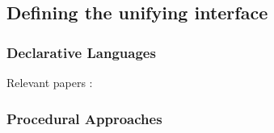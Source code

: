

\subsection{Defining the unifying interface}

\subsubsection{Declarative Languages}

Relevant papers : ~\cite{Lenzerini2002} ~\cite{Kirk1995} ~\cite{Katsis2009}
~\cite{Srivastava2006} ~\cite{Tatbul2010} ~\cite{Botan2009} ~\cite{Botan2010} ~\cite{Lim2013}
~\cite{Sharp2013} ~\cite{Cure2011} ~\cite{Atzeni2012} ~\cite{Sellami2014} ~\cite{Sellami2013}
~\cite{Ong2014} ~\cite{Ong2015} ~\cite{Boag2010} ~\cite{Ives2002} ~\cite{Borkar2006}
~\cite{Liu2010} ~\cite{Fowler2012}

\subsubsection{Procedural Approaches}

 
 
 
